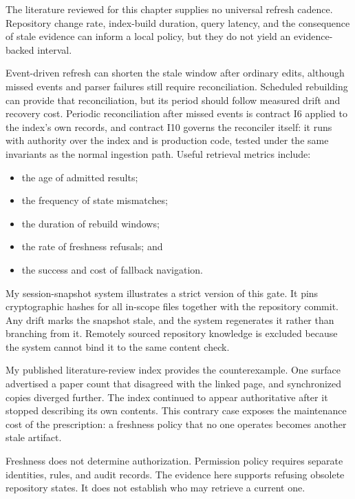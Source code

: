 The literature reviewed for this chapter supplies no universal refresh cadence. Repository change rate, index-build duration, query latency, and the consequence of stale evidence can inform a local policy, but they do not yield an evidence-backed interval.


Event-driven refresh can shorten the stale window after ordinary edits, although missed events and parser failures still require reconciliation. Scheduled rebuilding can provide that reconciliation, but its period should follow measured drift and recovery cost. Periodic reconciliation after missed events is contract I6 applied to the index's own records, and contract I10 governs the reconciler itself: it runs with authority over the index and is production code, tested under the same invariants as the normal ingestion path. Useful retrieval metrics include:

\begin{itemize}
\tightlist
\item
  the age of admitted results;
\item
  the frequency of state mismatches;
\item
  the duration of rebuild windows;
\item
  the rate of freshness refusals; and
\item
  the success and cost of fallback navigation.
\end{itemize}

My session-snapshot system illustrates a strict version of this gate. It pins cryptographic hashes for all in-scope files together with the repository commit. Any drift marks the snapshot stale, and the system regenerates it rather than branching from it. Remotely sourced repository knowledge is excluded because the system cannot bind it to the same content check.

My published literature-review index provides the counterexample. One surface advertised a paper count that disagreed with the linked page, and synchronized copies diverged further. The index continued to appear authoritative after it stopped describing its own contents. This contrary case exposes the maintenance cost of the prescription: a freshness policy that no one operates becomes another stale artifact.

Freshness does not determine authorization. Permission policy requires separate identities, rules, and audit records. The evidence here supports refusing obsolete repository states. It does not establish who may retrieve a current one.

